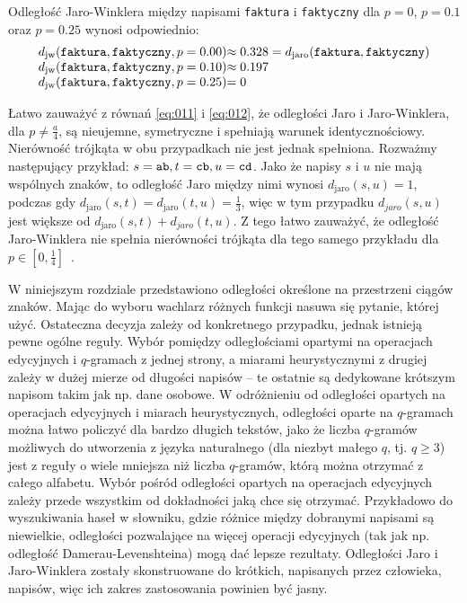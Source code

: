 \documentclass{praca1}
\begin{document}
\begin{example}
Odległość Jaro-Winklera między napisami \verb|faktura| i \verb|faktyczny| dla $p = 0$, $p = 0.1$ oraz $p = 0.25$ wynosi odpowiednio: 
\begin{equation*}
  \left.\begin{array}{l@{}l}
    d_{\mathrm{jw}}(\verb|faktura|, \verb|faktyczny|, p = 0.00) & \approx 0.328 = d_{\mathrm{jaro}}(\verb|faktura|, \verb|faktyczny|) \\
    d_{\mathrm{jw}}(\verb|faktura|, \verb|faktyczny|, p = 0.10) & \approx 0.197  \\
    d_{\mathrm{jw}}(\verb|faktura|, \verb|faktyczny|, p = 0.25) & =  0
  \end{array}\right.
\end{equation*}
\end{example}

Łatwo zauważyć z równań \eqref{eq:011} i \eqref{eq:012}, że odległości Jaro i Jaro-Winklera, dla $p \neq \frac{a}{4}$, są nieujemne,  symetryczne i spełniają warunek identycznościowy. Nierówność trójkąta w obu przypadkach nie jest jednak spełniona. Rozważmy następujący przykład: $s = \verb|ab|, t = \verb|cb|, u = \verb|cd|$. Jako że napisy $s$ i $u$ nie mają wspólnych znaków, to odległość Jaro między nimi wynosi $d_{\mathrm{jaro}}(s, u) = 1$, podczas gdy $d_{\mathrm{jaro}}(s, t) = d_{\mathrm{jaro}}(t, u) = \frac{1}{3}$, więc w tym przypadku $d_{jaro}(s, u)$ jest większe od $d_{\mathrm{jaro}}(s, t) + d_{jaro}(t, u)$. Z tego łatwo zauważyć, że odległość Jaro-Winklera nie spełnia nierówności trójkąta  dla tego samego przykładu dla $p \in [0, \frac{1}{4}]$~\cite{Loo2014:stringdist}.


W niniejszym rozdziale przedstawiono odległości określone na przestrzeni ciągów znaków. Mając do wyboru wachlarz różnych funkcji nasuwa się pytanie, której użyć. Ostateczna decyzja zależy od konkretnego przypadku, jednak istnieją pewne ogólne reguły. Wybór pomiędzy odległościami opartymi na operacjach edycyjnych i $q$-gramach z jednej strony, a miarami heurystycznymi z drugiej zależy w dużej mierze od długości napisów -- te ostatnie są dedykowane krótszym napisom takim jak np. dane osobowe. W odróżnieniu od odległości opartych na operacjach edycyjnych i miarach heurystycznych, odległości oparte na $q$-gramach można łatwo policzyć dla bardzo długich tekstów, jako że liczba $q$-gramów możliwych do utworzenia z języka naturalnego (dla niezbyt małego $q$, tj. $q \geq 3$) jest z reguły o wiele mniejsza niż liczba $q$-gramów, którą można otrzymać z całego alfabetu. Wybór pośród odległości opartych na operacjach edycyjnych zależy przede wszystkim od dokładności jaką chce się otrzymać. Przykładowo do wyszukiwania haseł w słowniku, gdzie różnice między dobranymi napisami są niewielkie, odległości pozwalające na więcej operacji edycyjnych (tak jak np. odległość Damerau-Levenshteina) mogą dać lepsze rezultaty. Odległości Jaro i Jaro-Winklera zostały skonstruowane do krótkich, napisanych przez człowieka, napisów, więc ich zakres zastosowania powinien być jasny.
\end{document}
